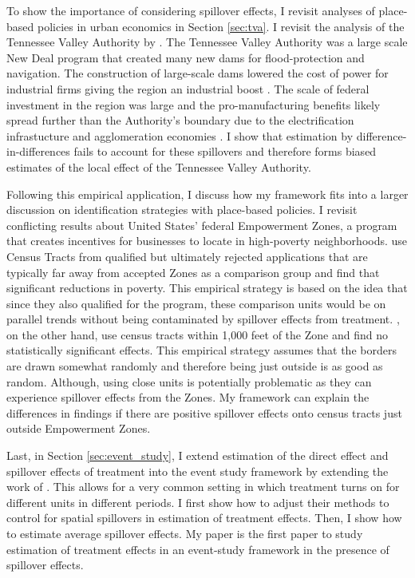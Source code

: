 \documentclass[11pt]{article}
\begin{document}
To show the importance of considering spillover effects, I revisit analyses of place-based policies in urban economics in Section \ref{sec:tva}. I revisit the analysis of the Tennessee Valley Authority by \citet{Kline_Moretti_2014}. The Tennessee Valley Authority was a large scale New Deal program that created many new dams for flood-protection and navigation. The construction of large-scale dams lowered the cost of power for industrial firms giving the region an industrial boost \citep{Kitchens_2014}. The scale of federal investment in the region was large and the pro-manufacturing benefits likely spread further than the Authority's boundary due to the electrification infrastucture and agglomeration economies \citep{Severnini_2014}. I show that estimation by difference-in-differences fails to account for these spillovers and therefore forms biased estimates of the local effect of the Tennessee Valley Authority.

Following this empirical application, I discuss how my framework fits into a larger discussion on identification strategies with place-based policies. I revisit conflicting results about United States' federal Empowerment Zones, a program that creates incentives for businesses to locate in high-poverty neighborhoods. \citet{Busso_Gregory_Kline_2013} use Census Tracts from qualified but ultimately rejected applications that are typically far away from accepted Zones as a comparison group and find that significant reductions in poverty. This empirical strategy is based on the idea that since they also qualified for the program, these comparison units would be on parallel trends without being contaminated by spillover effects from treatment. \citet{Neumark_Kolko_2010}, on the other hand, use census tracts within 1,000 feet of the Zone and find no statistically significant effects. This empirical strategy assumes that the borders are drawn somewhat randomly and therefore being just outside is as good as random. Although, using close units is potentially problematic as they can experience spillover effects from the Zones. My framework can explain the differences in findings if there are positive spillover effects onto census tracts just outside Empowerment Zones. 

Last, in Section \ref{sec:event_study}, I extend estimation of the direct effect and spillover effects of treatment into the event study framework by extending the work of \citet{Callaway_SantAnna_2020}. This allows for a very common setting in which treatment turns on for different units in different periods. I first show how to adjust their methods to control for spatial spillovers in estimation of treatment effects. Then, I show how to estimate average spillover effects. My paper is the first paper to study estimation of treatment effects in an event-study framework in the presence of spillover effects. 
\end{document}
